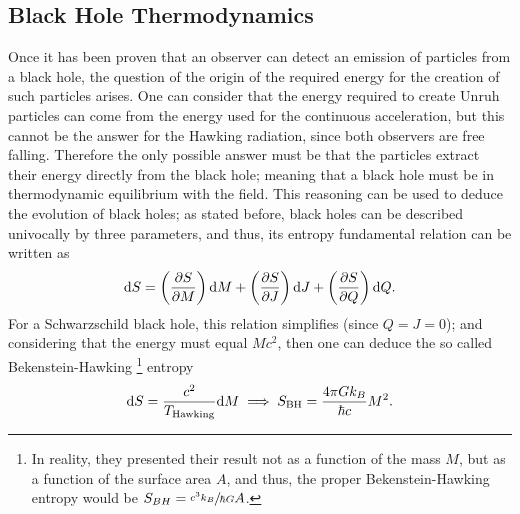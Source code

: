 \subsection{Black Hole Thermodynamics}
Once it has been proven that an observer can detect an emission of particles from a black hole, the question of the origin of the required energy for the creation of such particles arises. One can consider that the energy required to create Unruh particles can come from the energy used for the continuous acceleration, but this cannot be the answer for the Hawking radiation, since both observers are free falling. Therefore the only possible answer must be that the particles extract their energy directly from the black hole; meaning that a black hole must be in thermodynamic equilibrium with the field. This reasoning can be used to deduce the evolution of black holes; as stated before, black holes can be described univocally by three parameters, and thus, its entropy fundamental relation can be written as
\begin{equation}
	\text{d} S=\left(\frac{\partial S}{\partial M}\right)\text{d} M+\left(\frac{\partial S}{\partial J}\right)\text{d} J+\left(\frac{\partial S}{\partial Q}\right)\text{d} Q.
\end{equation}
For a Schwarzschild black hole, this relation simplifies (since $Q=J=0$); and considering that the energy must equal $Mc^2$, then one can deduce the so called Bekenstein-Hawking \footnote{In reality, they presented their result not as a function of the mass $M$, but as a function of the surface area $A$, and thus, the proper Bekenstein-Hawking entropy would be $S_{BH}=\sfrac{c^3k_B}{\hbar G}A$.} entropy 
\begin{equation}
	\text{d} S=\frac{c^2}{T_{\text{Hawking}}}\text{d} M\implies S_{\text{BH}}=\frac{4\pi Gk_B}{\hbar c}M^2.
\end{equation}

